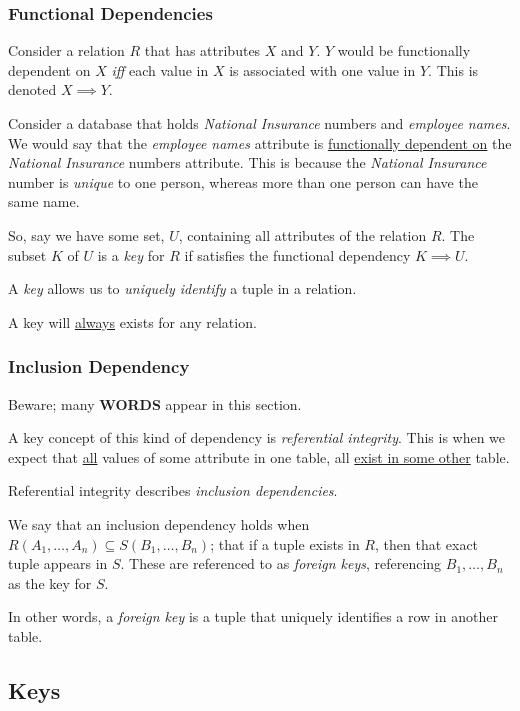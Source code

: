 \documentclass{article}
\begin{document}
\subsubsection{Functional Dependencies}

Consider a relation $R$ that has attributes $X$ and $Y$. $Y$ would be functionally dependent on $X$ \textit{iff} each value in $X$ is associated with one value in $Y$. This is denoted $X \implies Y$.

Consider a database that holds \textit{National Insurance} numbers and \textit{employee names}. We would say that the \textit{employee names} attribute is \underline{functionally dependent on} the \textit{National Insurance} numbers attribute. This is because the \textit{National Insurance} number is \textit{unique} to one person, whereas more than one person can have the same name.

So, say we have some set, $U$, containing all attributes of the relation $R$. The subset $K$ of $U$ is a \textit{key} for $R$ if satisfies the functional dependency $K \implies U$.

A \textit{key} allows us to \textit{uniquely identify} a tuple in a relation.

A key will \underline{always} exists for any relation.

\subsubsection{Inclusion Dependency}

Beware; many \textbf{WORDS} appear in this section.

A key concept of this kind of dependency is \textit{referential integrity}. This is when we expect that \underline{all} values of some attribute in one table, all \underline{exist in some other} table.

Referential integrity describes \textit{inclusion dependencies}.

We say that an inclusion dependency holds when $R(A_1, \ldots, A_n) \subseteq S(B_1, \ldots, B_n)$; that if a tuple exists in $R$, then that exact tuple appears in $S$. These are referenced to as \textit{foreign keys}, referencing $B_1, \ldots, B_n$ as the key for $S$.

In other words, a \textit{foreign key} is a tuple that uniquely identifies a row in another table.

\filbreak
\subsection{Keys}
\end{document}
